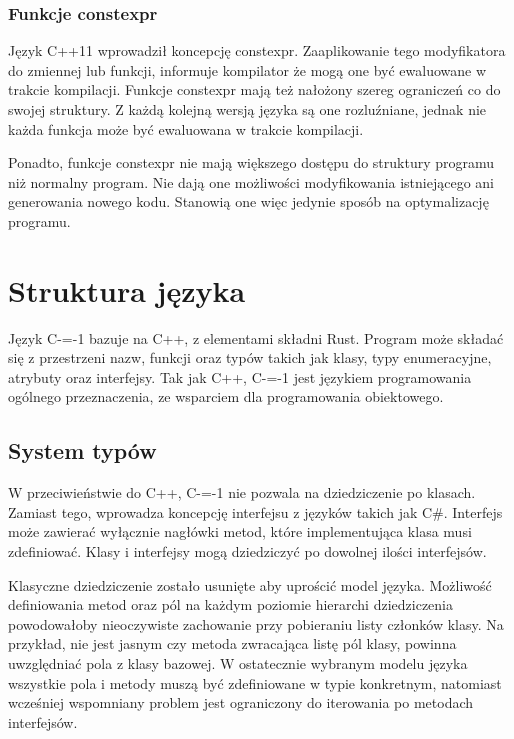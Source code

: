 \documentclass[conference]{IEEEtran}
\begin{document}
\subsubsection{Funkcje constexpr}
Język C++11 wprowadził koncepcję constexpr. Zaaplikowanie tego modyfikatora do zmiennej lub funkcji, informuje kompilator że mogą one być ewaluowane w trakcie kompilacji. Funkcje constexpr mają też nałożony szereg ograniczeń co do swojej struktury. Z każdą kolejną wersją języka są one rozluźniane, jednak nie każda funkcja może być ewaluowana w trakcie kompilacji.\par
Ponadto, funkcje constexpr nie mają większego dostępu do struktury programu niż normalny program. Nie dają one możliwości modyfikowania istniejącego ani generowania nowego kodu. Stanowią one więc jedynie sposób na optymalizację programu.\par


\section{Struktura języka}

Język C-=-1 bazuje na C++, z elementami składni Rust.
Program może składać się z przestrzeni nazw, funkcji oraz typów takich jak klasy, typy enumeracyjne, atrybuty oraz interfejsy.
Tak jak C++, C-=-1 jest językiem programowania ogólnego przeznaczenia, ze wsparciem dla programowania obiektowego.

\subsection{System typów}

W przeciwieństwie do C++, C-=-1 nie pozwala na dziedziczenie po klasach.
Zamiast tego, wprowadza koncepcję interfejsu z języków takich jak C\#.
Interfejs może zawierać wyłącznie nagłówki metod, które implementująca klasa musi zdefiniować.
Klasy i interfejsy mogą dziedziczyć po dowolnej ilości interfejsów.

Klasyczne dziedziczenie zostało usunięte aby uprościć model języka.
Możliwość definiowania metod oraz pól na każdym poziomie hierarchi dziedziczenia powodowałoby nieoczywiste zachowanie przy pobieraniu listy członków klasy.
Na przykład, nie jest jasnym czy metoda zwracająca listę pól klasy, powinna uwzględniać pola z klasy bazowej.
W ostatecznie wybranym modelu języka wszystkie pola i metody muszą być zdefiniowane w typie konkretnym, natomiast wcześniej wspomniany problem jest ograniczony do iterowania po metodach interfejsów.
\end{document}

